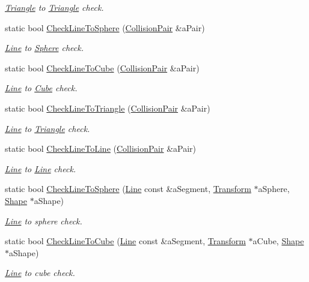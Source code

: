 \begin{DoxyCompactItemize}
\begin{DoxyCompactList}\small\item\em \hyperlink{structTriangle}{Triangle} to \hyperlink{structTriangle}{Triangle} check. \end{DoxyCompactList}\item 
static bool \hyperlink{classCollisionChecker_acefac1aee27cb4bdb27fc1593956e1c2}{Check\+Line\+To\+Sphere} (\hyperlink{structCollisionPair}{Collision\+Pair} \&a\+Pair)
\begin{DoxyCompactList}\small\item\em \hyperlink{structLine}{Line} to \hyperlink{structSphere}{Sphere} check. \end{DoxyCompactList}\item 
static bool \hyperlink{classCollisionChecker_ac0b570164b6bad0d85413eaeda1943b4}{Check\+Line\+To\+Cube} (\hyperlink{structCollisionPair}{Collision\+Pair} \&a\+Pair)
\begin{DoxyCompactList}\small\item\em \hyperlink{structLine}{Line} to \hyperlink{structCube}{Cube} check. \end{DoxyCompactList}\item 
static bool \hyperlink{classCollisionChecker_a8eec9b61fc47fa08928a9060b5e3eb13}{Check\+Line\+To\+Triangle} (\hyperlink{structCollisionPair}{Collision\+Pair} \&a\+Pair)
\begin{DoxyCompactList}\small\item\em \hyperlink{structLine}{Line} to \hyperlink{structTriangle}{Triangle} check. \end{DoxyCompactList}\item 
static bool \hyperlink{classCollisionChecker_a47c7a27c3a099cc75c03ac48d6618fab}{Check\+Line\+To\+Line} (\hyperlink{structCollisionPair}{Collision\+Pair} \&a\+Pair)
\begin{DoxyCompactList}\small\item\em \hyperlink{structLine}{Line} to \hyperlink{structLine}{Line} check. \end{DoxyCompactList}\item 
static bool \hyperlink{classCollisionChecker_a377bd5becf8f04d6b66dc0d25c0f898a}{Check\+Line\+To\+Sphere} (\hyperlink{structLine}{Line} const \&a\+Segment, \hyperlink{classTransform}{Transform} $\ast$a\+Sphere, \hyperlink{structShape}{Shape} $\ast$a\+Shape)
\begin{DoxyCompactList}\small\item\em \hyperlink{structLine}{Line} to sphere check. \end{DoxyCompactList}\item 
static bool \hyperlink{classCollisionChecker_a8108838f3855f31658bf7508754af9d7}{Check\+Line\+To\+Cube} (\hyperlink{structLine}{Line} const \&a\+Segment, \hyperlink{classTransform}{Transform} $\ast$a\+Cube, \hyperlink{structShape}{Shape} $\ast$a\+Shape)
\begin{DoxyCompactList}\small\item\em \hyperlink{structLine}{Line} to cube check. \end{DoxyCompactList}\end{DoxyCompactItemize}


